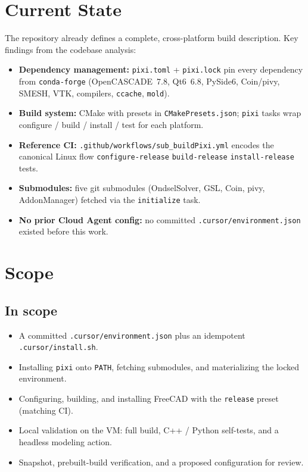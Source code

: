 \documentclass[11pt]{article}
\begin{document}
\section{Current State}
The repository already defines a complete, cross-platform build description. Key findings from the codebase analysis:

\begin{itemize}
  \item \textbf{Dependency management:} \texttt{pixi.toml} + \texttt{pixi.lock} pin every dependency from \texttt{conda-forge} (OpenCASCADE~7.8, Qt6~6.8, PySide6, Coin/pivy, SMESH, VTK, compilers, \texttt{ccache}, \texttt{mold}).
  \item \textbf{Build system:} CMake with presets in \texttt{CMakePresets.json}; \texttt{pixi} tasks wrap configure / build / install / test for each platform.
  \item \textbf{Reference CI:} \texttt{.github/workflows/sub\_buildPixi.yml} encodes the canonical Linux flow \textemdash{} \texttt{configure-release} \textrightarrow{} \texttt{build-release} \textrightarrow{} \texttt{install-release} \textrightarrow{} tests.
  \item \textbf{Submodules:} five git submodules (OndselSolver, GSL, Coin, pivy, AddonManager) fetched via the \texttt{initialize} task.
  \item \textbf{No prior Cloud Agent config:} no committed \texttt{.cursor/environment.json} existed before this work.
\end{itemize}

\section{Scope}

\subsection{In scope}
\begin{itemize}
  \item A committed \texttt{.cursor/environment.json} plus an idempotent \texttt{.cursor/install.sh}.
  \item Installing \texttt{pixi} onto \texttt{PATH}, fetching submodules, and materializing the locked environment.
  \item Configuring, building, and installing FreeCAD with the \texttt{release} preset (matching CI).
  \item Local validation on the VM: full build, C++ / Python self-tests, and a headless modeling action.
  \item Snapshot, prebuilt-build verification, and a proposed configuration for review.
\end{itemize}
\end{document}
